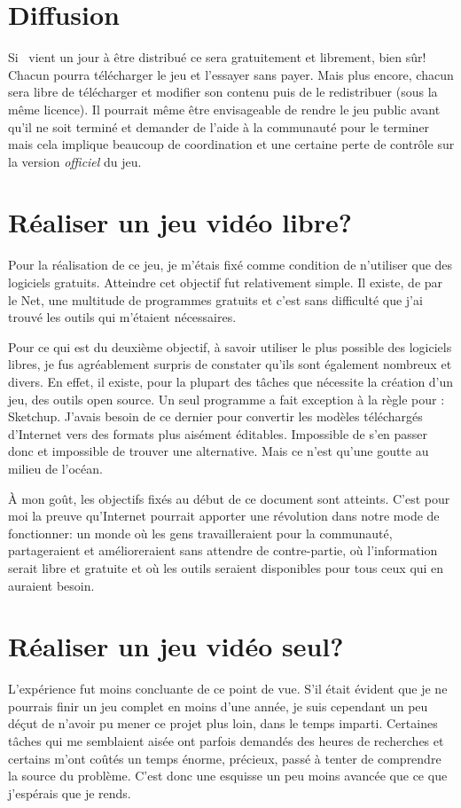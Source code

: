 
\printMiniToc

\section{Diffusion}
Si \nomJeu\ vient un jour à être distribué ce sera gratuitement et librement, bien sûr! Chacun pourra télécharger le jeu et l'essayer sans payer. Mais plus encore, chacun sera libre de télécharger et modifier son contenu puis de le redistribuer (sous la même licence). Il pourrait même être envisageable de rendre le jeu public avant qu'il ne soit terminé et demander de l'aide à la communauté pour le terminer mais cela implique beaucoup de coordination et une certaine perte de contrôle sur la version \textit{officiel} du jeu.


\section{Réaliser un jeu vidéo libre?}
Pour la réalisation de ce jeu, je m'étais fixé comme condition de n'utiliser que des logiciels gratuits. Atteindre cet objectif fut relativement simple. Il existe, de par le Net, une multitude de programmes gratuits et c'est sans difficulté que j'ai trouvé les outils qui m'étaient nécessaires.

Pour ce qui est du deuxième objectif, à savoir utiliser le plus possible des logiciels libres, je fus agréablement surpris de constater qu'ils sont également nombreux et divers. En effet, il existe, pour la plupart des tâches que nécessite la création d'un jeu, des outils open source. Un seul programme a fait exception à la règle pour \nomJeu: Sketchup. J'avais besoin de ce dernier pour convertir les modèles téléchargés d'Internet vers des formats plus aisément éditables. Impossible de s'en passer donc et impossible de trouver une alternative. Mais ce n'est qu'une goutte au milieu de l'océan.

À mon goût, les objectifs fixés au début de ce document sont atteints. C'est pour moi la preuve qu'Internet pourrait apporter une révolution dans notre mode de fonctionner: un monde où les gens travailleraient pour la communauté, partageraient et amélioreraient sans attendre de contre-partie, où l'information serait libre et gratuite et où les outils seraient disponibles pour tous ceux qui en auraient besoin.


\section{Réaliser un jeu vidéo seul?}
L'expérience fut moins concluante de ce point de vue. S'il était évident que je ne pourrais finir un jeu complet en moins d'une année, je suis cependant un peu déçut de n'avoir pu mener ce projet plus loin, dans le temps imparti. Certaines tâches qui me semblaient aisée ont parfois demandés des heures de recherches et certains  m'ont coûtés un temps énorme, précieux, passé à tenter de comprendre la source du problème. C'est donc une esquisse un peu moins avancée que ce que j'espérais que je rends.

